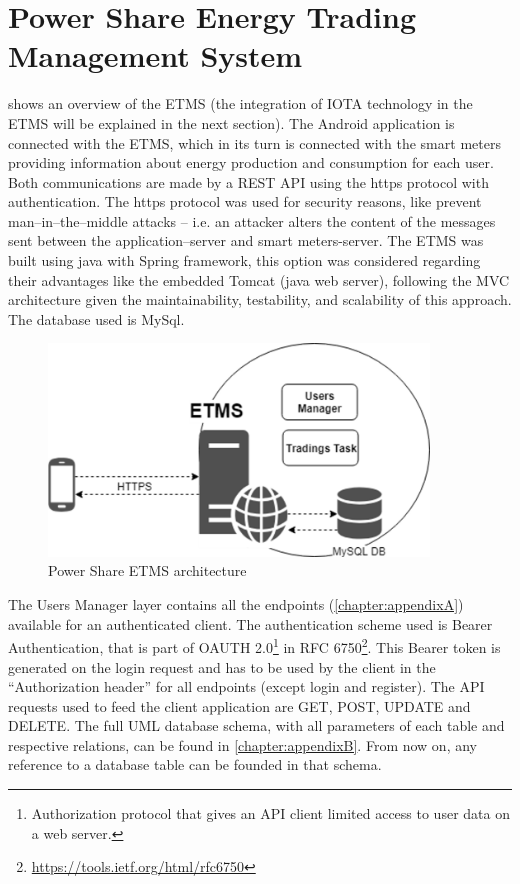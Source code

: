 \section{Power Share Energy Trading Management System}\label{psetms}


 shows an overview of the ETMS (the integration of IOTA technology in the ETMS will be explained in the next section). The Android application is connected with the ETMS, which in its turn is connected with the smart meters providing information about energy production and consumption for each user. Both communications are made by a REST API using the https protocol with authentication. The https protocol was used for security reasons, like prevent man--in--the--middle attacks -- i.e. an attacker alters the content of the messages sent between the application--server and smart meters-server.
The ETMS was built using java with Spring framework, this option was considered regarding their advantages like the embedded Tomcat (java web server), following the \ac{MVC} architecture given the maintainability, testability, and scalability of this approach. The database used is MySql.


\begin{figure}[h]
\centering
\includegraphics[width=0.9\textwidth]{./Images/ps12}
\caption{Power Share \ac{ETMS} architecture}
\label{fig:ps12}
\end{figure}

The Users Manager layer contains all the endpoints (\cref{chapter:appendixA}) available for an authenticated client. The authentication scheme used is Bearer Authentication, that is part of OAUTH 2.0\footnote{Authorization protocol that gives an \ac{API} client limited access to user data on a web server.} in RFC 6750\footnote{\url{https://tools.ietf.org/html/rfc6750}}. This Bearer token is generated on the login request and has to be used by the client in the “Authorization header” for all endpoints (except login and register). The \ac{API} requests used to feed the client application are GET, POST, UPDATE and DELETE. The full \ac{UML} database schema, with all parameters of each table and respective relations, can be found in \cref{chapter:appendixB}. From now on, any reference to a database table can be founded in that schema. 


